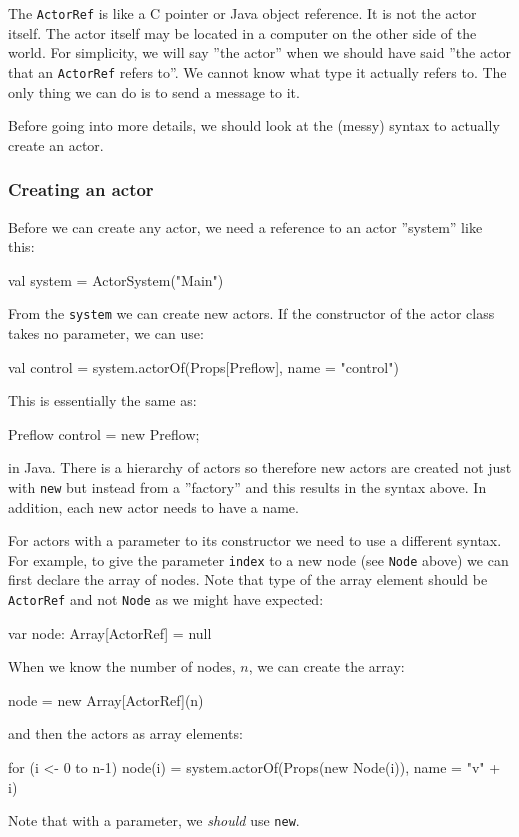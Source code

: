 \documentclass{forsete}
\begin{document}
The \verb.ActorRef. is like a C pointer or Java object reference. It is not the actor itself.
The actor itself may be located in a computer on the other side of the world. For simplicity,
we will say ''the actor'' when we should have said ''the actor that an \verb.ActorRef. refers to''.
We cannot know what type it actually refers to. The only thing we can do is to send
a message to it.

Before going into more details, we should look at the (messy) syntax to actually create an actor.

\subsubsection*{Creating an actor}
Before we can create any actor, we need a reference to an actor ''system'' like this:
\begin{ccode}
	val system = ActorSystem("Main")
\end{ccode}
From the \verb.system. we can create new actors. If the constructor of the actor class
takes no parameter, we can use:
\begin{ccode}
val control = system.actorOf(Props[Preflow], name = "control")
\end{ccode}
This is essentially the same as:
\begin{ccode}
Preflow control = new Preflow;
\end{ccode}
in Java. There is a hierarchy of actors so therefore new actors are created not just with \verb.new.
but instead from a ''factory'' and this results in the syntax above. In addition, each new actor needs
to have a name.

For actors with a parameter to its constructor we need to use a different syntax.
For example, to give the parameter \verb.index. to a new node (see \verb.Node. above) we
can first declare the array of nodes. Note that type of the array element should be \verb.ActorRef.
and not \verb.Node. as we might have expected:
\begin{ccode}
var	node: Array[ActorRef] = null
\end{ccode}

\noindent When we know the number of nodes, $n$, we can create the array:
\begin{ccode}
node = new Array[ActorRef](n)
\end{ccode}

\noindent and then the actors as array elements:

\begin{ccode}
for (i <- 0 to n-1)
	node(i) = system.actorOf(Props(new Node(i)), name = "v" + i)
\end{ccode}
Note that with a parameter, we {\em should} use \verb.new..
\end{document}

